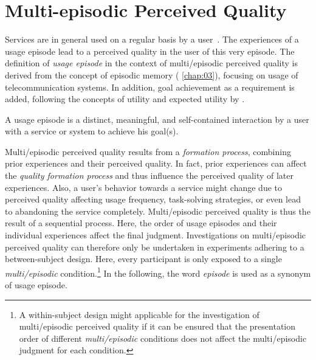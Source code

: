 

\section{Multi-episodic Perceived Quality}\label{chap:state-of-the-art}

Services are in general used on a regular basis by a user~\citep[\cf{}][]{geerts_linking_2010}.
The experiences of a usage episode lead to a perceived quality in the user of this very episode.
The definition of \emph{usage episode} in the context of multi\-/episodic perceived quality is derived from the concept of episodic memory (\cf{} \autoref{chap:03}), focusing on usage of telecommunication systems.
In addition, goal achievement as a requirement is added, following the concepts of utility and expected utility by \citet{kahneman_experienced_2000}.

\begin{definition}\label{def:episode}
A usage episode is a distinct, meaningful, and self-contained interaction by a user with a service or system to achieve his goal(s).
\end{definition}
Multi\-/episodic perceived quality results from a \emph{formation process}, combining prior experiences and their perceived quality.
In fact, prior experiences can affect the \emph{quality formation process} and thus influence the perceived quality of later experiences. 
Also, a user's behavior towards a service might change due to perceived quality affecting usage frequency, task-solving strategies, or even lead to abandoning the service completely.
Multi\-/episodic perceived quality is thus the result of a sequential process.
Here, the order of usage episodes and their individual experiences affect the final judgment.
Investigations on multi\-/episodic perceived quality can therefore only be undertaken in experiments adhering to a between-subject design.
Here, every participant is only exposed to a single \emph{multi\-/episodic} condition.\footnote{A within-subject design might applicable for the investigation of multi\-/episodic perceived quality if it can be ensured that the presentation order of different \emph{multi\-/episodic} conditions does not affect the multi\-/episodic judgment for each condition.} 
In the following, the word \emph{episode} is used as a synonym of usage episode.

